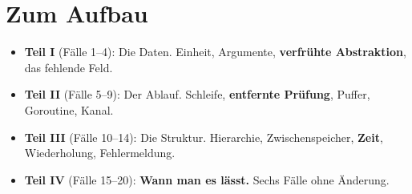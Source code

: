 \section*{Zum Aufbau}

\begin{itemize}
\item \textbf{Teil I} (Fälle 1--4): Die Daten. Einheit, Argumente, \textbf{verfrühte Abstraktion}, das fehlende Feld.
\item \textbf{Teil II} (Fälle 5--9): Der Ablauf. Schleife, \textbf{entfernte Prüfung}, Puffer, Goroutine, Kanal.
\item \textbf{Teil III} (Fälle 10--14): Die Struktur. Hierarchie, Zwischenspeicher, \textbf{Zeit}, Wiederholung, Fehlermeldung.
\item \textbf{Teil IV} (Fälle 15--20): \textbf{Wann man es lässt.} Sechs Fälle ohne Änderung.
\end{itemize}

